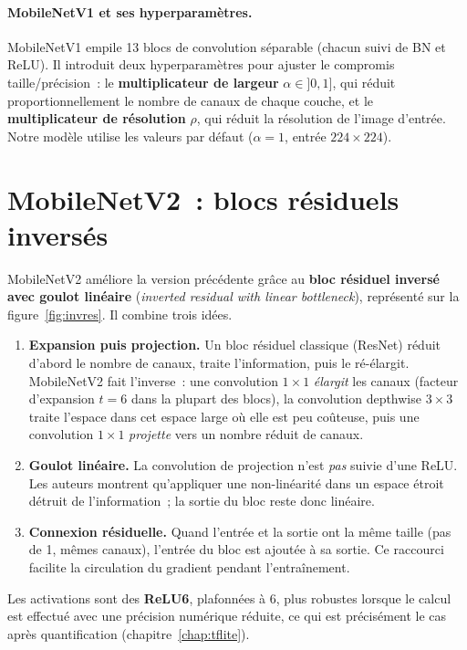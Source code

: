 \paragraph{MobileNetV1 et ses hyperparamètres.} MobileNetV1 empile 13 blocs de convolution séparable (chacun suivi de BN et ReLU). Il introduit deux hyperparamètres pour ajuster le compromis taille/précision~: le \textbf{multiplicateur de largeur} $\alpha\in]0,1]$, qui réduit proportionnellement le nombre de canaux de chaque couche, et le \textbf{multiplicateur de résolution} $\rho$, qui réduit la résolution de l’image d’entrée. Notre modèle utilise les valeurs par défaut ($\alpha=1$, entrée $224\times224$).

\section{MobileNetV2~: blocs résiduels inversés}

MobileNetV2 améliore la version précédente grâce au \textbf{bloc résiduel inversé avec goulot linéaire} (\emph{inverted residual with linear bottleneck}), représenté sur la figure~\ref{fig:invres}. Il combine trois idées.

\begin{enumerate}
  \item \textbf{Expansion puis projection.} Un bloc résiduel classique (ResNet) réduit d’abord le nombre de canaux, traite l’information, puis le ré-élargit. MobileNetV2 fait l’inverse~: une convolution $1\times1$ \emph{élargit} les canaux (facteur d’expansion $t=6$ dans la plupart des blocs), la convolution depthwise $3\times3$ traite l’espace dans cet espace large où elle est peu coûteuse, puis une convolution $1\times1$ \emph{projette} vers un nombre réduit de canaux.
  \item \textbf{Goulot linéaire.} La convolution de projection n’est \emph{pas} suivie d’une ReLU. Les auteurs montrent qu’appliquer une non-linéarité dans un espace étroit détruit de l’information~; la sortie du bloc reste donc linéaire.
  \item \textbf{Connexion résiduelle.} Quand l’entrée et la sortie ont la même taille (pas de 1, mêmes canaux), l’entrée du bloc est ajoutée à sa sortie. Ce raccourci facilite la circulation du gradient pendant l’entraînement.
\end{enumerate}

Les activations sont des \textbf{ReLU6}, plafonnées à 6, plus robustes lorsque le calcul est effectué avec une précision numérique réduite, ce qui est précisément le cas après quantification (chapitre~\ref{chap:tflite}).

